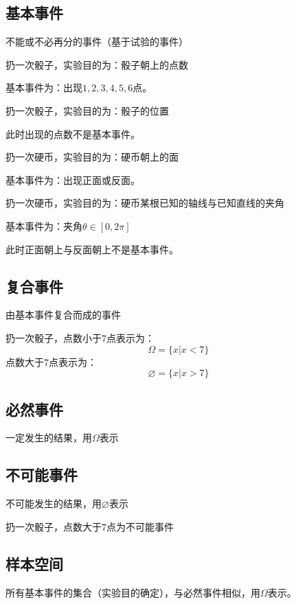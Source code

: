 \subsection{基本事件}%
\label{sub:基本事件}
不能或不必再分的事件（基于试验的事件）
\begin{eg}
	扔一次骰子，实验目的为：骰子朝上的点数

	基本事件为：出现$1,2,3,4,5,6$点。
\end{eg}
\begin{eg}
	扔一次骰子，实验目的为：骰子的位置

	此时出现的点数不是基本事件。
\end{eg}
\begin{eg}
	扔一次硬币，实验目的为：硬币朝上的面

	基本事件为：出现正面或反面。
\end{eg}
\begin{eg}
	扔一次硬币，实验目的为：硬币某根已知的轴线与已知直线的夹角

	基本事件为：夹角$\theta\in [0,2\pi]$

	此时正面朝上与反面朝上不是基本事件。
\end{eg}
\subsection{复合事件}%
\label{sub:复合事件}
由基本事件复合而成的事件
\begin{eg}
	扔一次骰子，点数小于$7$点表示为：
	$$
	\Omega=\{x|x<7\}
	$$
	点数大于$7$点表示为：
	$$
	\varnothing=\{x|x>7\}
	$$
\end{eg}
\subsection{必然事件}%
\label{sub:必然事件}
一定发生的结果，用$\Omega$表示
\subsection{不可能事件}%
\label{sub:不可能事件}
不可能发生的结果，用$\varnothing$表示
\begin{eg}
	扔一次骰子，点数大于$7$点为不可能事件
\end{eg}
\subsection{样本空间}%
\label{sub:样本空间}
所有基本事件的集合（实验目的确定），与必然事件相似，用$\Omega$表示。
